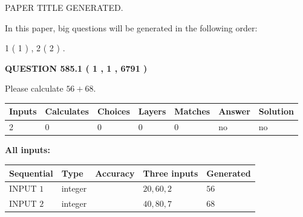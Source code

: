 \documentclass[12pt]{article}
\begin{document}
   
\vspace{0.2in}
   
   
   
   
   
   
   
   
 \vspace{0.2in}
 
 
 
 
   
   
 PAPER TITLE GENERATED.
   
   
   
\vspace{0.2in}
   
In this paper, big questions will be generated in the following order: 
   
   
   1 ( 1 )
 ,
   2 ( 2 )
 .
  
\vspace{0.2in}
  
{\textbf{\Large{QUESTION
585.1 
 ( 1 , 1 , 6791 )
}}}
  
  
 
Please calculate $ %
56 +  %
68 $.
 
 
   
   
   
   
\noindent\begin{tabular}{|l|l|l|l|l|l|l|}
 \hline
Inputs & Calculates & Choices & Layers & Matches & Answer & Solution \\ \hline
 2  & 
 0  & 
 0
  & 
 0  & 
 0  & 
  no & 
  no 
  \\ \hline
 \end{tabular}
   
   
   
   
\noindent{}
   
   
   
   
\noindent\vspace{0.1in}\hspace{-0.08in} {\textbf{\Large{All inputs: }}}
   
   
  
  
\noindent\begin{tabular}{|l|l|l|l|l|}
\hline
 Sequential & Type & Accuracy & Three inputs & Generated \\ 
\hline
 
 
  INPUT $  1 $ & integer &  & $
 20
 , 
 60
 , 
 2
 $ & $ 56 $ 
 \\  \hline  
 
 
  INPUT $  2 $ & integer &  & $
 40
 , 
 80
 , 
 7
 $ & $ 68 $ 
 \\  \hline  
 \end{tabular}
   
\end{document}
